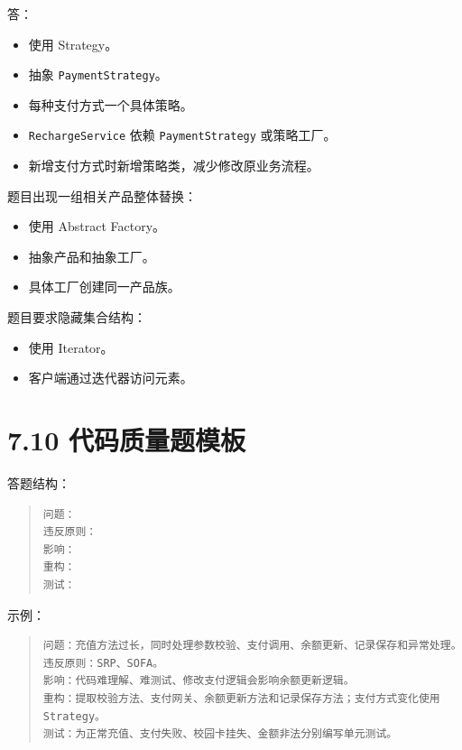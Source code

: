 \documentclass[UTF8,zihao=-4]{ctexart}
\begin{document}
答：

\begin{itemize}
\item 使用 Strategy。
\item 抽象 \texttt{PaymentStrategy}。
\item 每种支付方式一个具体策略。
\item \texttt{RechargeService} 依赖 \texttt{PaymentStrategy} 或策略工厂。
\item 新增支付方式时新增策略类，减少修改原业务流程。
\end{itemize}

题目出现一组相关产品整体替换：

\begin{itemize}
\item 使用 Abstract Factory。
\item 抽象产品和抽象工厂。
\item 具体工厂创建同一产品族。
\end{itemize}

题目要求隐藏集合结构：

\begin{itemize}
\item 使用 Iterator。
\item 客户端通过迭代器访问元素。
\end{itemize}

\section{7.10 代码质量题模板}

答题结构：

\begin{quote}
\footnotesize
\begin{verbatim}
问题：
违反原则：
影响：
重构：
测试：
\end{verbatim}
\end{quote}

示例：

\begin{quote}
\footnotesize
\begin{verbatim}
问题：充值方法过长，同时处理参数校验、支付调用、余额更新、记录保存和异常处理。
违反原则：SRP、SOFA。
影响：代码难理解、难测试、修改支付逻辑会影响余额更新逻辑。
重构：提取校验方法、支付网关、余额更新方法和记录保存方法；支付方式变化使用 
Strategy。
测试：为正常充值、支付失败、校园卡挂失、金额非法分别编写单元测试。
\end{verbatim}
\end{quote}
\end{document}
